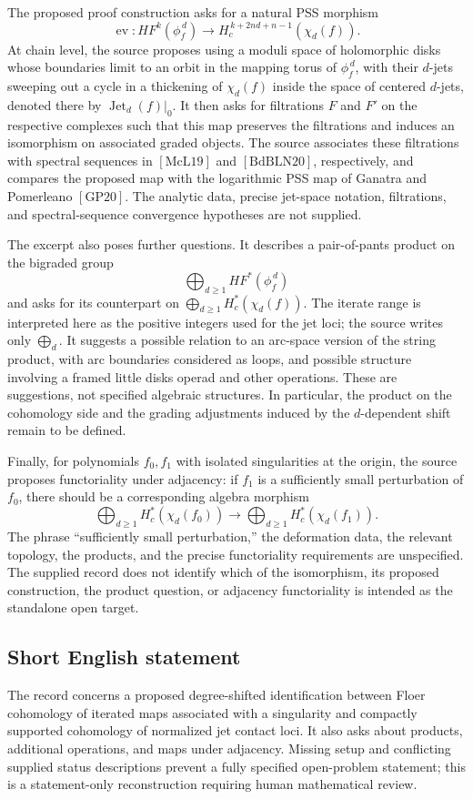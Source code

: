 \documentclass[11pt]{article}
\begin{document}
The proposed proof construction asks for a natural PSS morphism
\[
\operatorname{ev}\colon HF^k(\phi_f^{\,d})\longrightarrow H_c^{\,k+2nd+n-1}(\chi_d(f)).
\]
At chain level, the source proposes using a moduli space of holomorphic disks whose boundaries limit to an orbit in the mapping torus of \(\phi_f^{\,d}\), with their \(d\)-jets sweeping out a cycle in a thickening of \(\chi_d(f)\) inside the space of centered \(d\)-jets, denoted there by \(\operatorname{Jet}_d(f)|_0\). It then asks for filtrations \(F\) and \(F'\) on the respective complexes such that this map preserves the filtrations and induces an isomorphism on associated graded objects. The source associates these filtrations with spectral sequences in \([\mathrm{McL19}]\) and \([\mathrm{BdBLN20}]\), respectively, and compares the proposed map with the logarithmic PSS map of Ganatra and Pomerleano \([\mathrm{GP20}]\). The analytic data, precise jet-space notation, filtrations, and spectral-sequence convergence hypotheses are not supplied.

The excerpt also poses further questions. It describes a pair-of-pants product on the bigraded group
\[
\bigoplus_{d\geq1}HF^*(\phi_f^{\,d})
\]
and asks for its counterpart on \(\bigoplus_{d\geq1}H_c^*(\chi_d(f))\). The iterate range is interpreted here as the positive integers used for the jet loci; the source writes only \(\bigoplus_d\). It suggests a possible relation to an arc-space version of the string product, with arc boundaries considered as loops, and possible structure involving a framed little disks operad and other operations. These are suggestions, not specified algebraic structures. In particular, the product on the cohomology side and the grading adjustments induced by the \(d\)-dependent shift remain to be defined.

Finally, for polynomials \(f_0,f_1\) with isolated singularities at the origin, the source proposes functoriality under adjacency: if \(f_1\) is a sufficiently small perturbation of \(f_0\), there should be a corresponding algebra morphism
\[
\bigoplus_{d\geq1}H_c^*(\chi_d(f_0))\longrightarrow
\bigoplus_{d\geq1}H_c^*(\chi_d(f_1)).
\]
The phrase ``sufficiently small perturbation,'' the deformation data, the relevant topology, the products, and the precise functoriality requirements are unspecified. The supplied record does not identify which of the isomorphism, its proposed construction, the product question, or adjacency functoriality is intended as the standalone open target.
\subsection{Short English statement}
The record concerns a proposed degree-shifted identification between Floer cohomology of iterated maps associated with a singularity and compactly supported cohomology of normalized jet contact loci. It also asks about products, additional operations, and maps under adjacency. Missing setup and conflicting supplied status descriptions prevent a fully specified open-problem statement; this is a statement-only reconstruction requiring human mathematical review.
\end{document}

